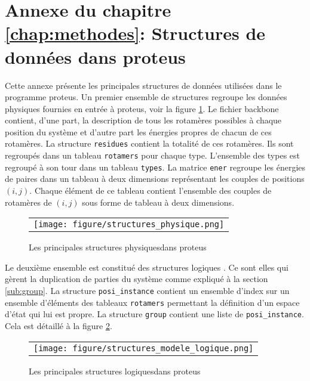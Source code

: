 \chapter*{Annexe du chapitre \ref{chap:methodes}: Structures de données dans proteus}
\label{chap:annexeproteus}

Cette annexe présente les principales structures de données utilisées dans le programme proteus. Un premier ensemble de structures regroupe les données physiques fournies en entrée à proteus, voir la figure \ref{fig:structPhy}. Le fichier backbone contient, d'une part, la description de tous les rotamères possibles à chaque position du système et d'autre part les énergies propres de chacun de ces rotamères. La structure \verb!residues! contient la totalité de ces rotamères. Ils sont regroupés dans un tableau \verb!rotamers!  pour chaque type. L'ensemble des types est regroupé à son tour dans un tableau \verb!types!. La matrice \verb!ener! regroupe les énergies de paires dans un tableau à deux dimensions représentant les couples de positions $(i,j)$. Chaque élément de ce tableau contient l'ensemble des couples de rotamères de $(i,j)$  sous forme de tableau à deux dimensions.
   \begin{figure}[!htbp]
     \centering
     \begin{tabular}{c}
       \texttt{[image: figure/structures\_physique.png]} 
     \end{tabular}
     
     \caption{Les principales structures \og physiques\fg  dans proteus}
\label{fig:structPhy}
   \end{figure}

Le deuxième ensemble est constitué des structures \og logiques \fg. Ce sont elles qui gèrent la duplication de parties du système comme expliqué à la section \ref{sub:group}. La structure \verb!posi_instance! contient un ensemble d'index sur un ensemble d'éléments des tableaux \verb!rotamers! permettant la définition d'un espace d'état qui lui est propre. La structure \verb!group! contient une liste de \verb!posi_instance!. Cela est détaillé à la figure  \ref{fig:structLog}.    
   \begin{figure}[!htbp]
     \centering
     \begin{tabular}{c}
       \texttt{[image: figure/structures\_modele\_logique.png]} 
     \end{tabular}
     
     \caption{Les principales structures \og logiques\fg  dans proteus}
\label{fig:structLog}
   \end{figure}
   
